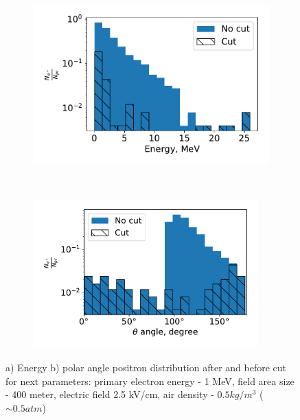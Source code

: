 \documentclass{webofc}
\begin{document}
    \begin{figure}[ht!]
        \begin{subfigure}[b]{0.5\textwidth}
            \includegraphics[width=0.95\linewidth]{pictures/04_energy_cut_positron}
            \caption{}
            \label{pic-positron-cut-a}
        \end{subfigure}
        ~
        \begin{subfigure}[b]{0.5\textwidth}
            \includegraphics[width=0.95\textwidth]{pictures/05_theta_cut_positron}
            \caption{}
            \label{pic-positron-cut-b}
        \end{subfigure}
        \caption{ a) Energy b) polar angle positron distribution after and before cut for next parameters: primary electron energy - 1 MeV, field area size - 400 meter, electric field 2.5 kV/cm, air density - $0.5 kg/m^3$ ($\sim 0.5 atm$)}
    \end{figure}
    
\end{document}
